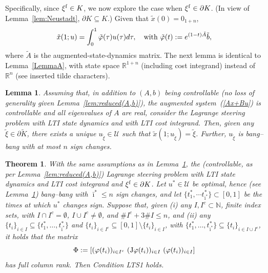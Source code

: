 \documentclass[letterpaper,10pt,conference]{ieeeconf}
\def\R{{\mathbb{R}}}
\def\N{{\mathbb{N}}}
\newtheorem{theorem}{Theorem} %
\newtheorem{lemma}{Lemma} %
\begin{document}
Specifically, since $\xi^{\rm f}\in K$, we now 
explore the case when $\xi^{\rm f}\in\partial K$.
(In view of Lemma~\ref{lem:Neustadt}, $\partial K\subseteq K$.)
Given that $\tilde x(0)=0_{1+n}$,
\[
\tilde x(1;u) =\int_0^1 \tilde\varphi(\tau)u(\tau)d\tau,
\quad {\rm with~} \tilde\varphi(t):=e^{(1-t)\tilde A}\tilde b,
\]
where $\tilde A$ is the augmented-state-dynamics matrix.
The next lemma is identical to Lemma~\ref{LemmaA}, with state space
$\R^{1+n}$ 
(including cost integrand) instead of $\R^n$ (see inserted 
tilde characters).
\begin{lemma}
\label{LemmaB}
Assuming that, in addition to $(A,b)$ being controllable
(no loss of generality given Lemma~\ref{lem:reduced(A,b)}),
the augmented system~(\ref{Ax+Bu}) is controllable and all
eigenvalues of $A$ are real, consider the Lagrange steering 
problem with LTI state dynamics %
and with LTI cost integrand.  
Then, given any $\tilde\xi\in\partial\tilde K$, there exists a unique
$u_{\tilde\xi}\in\mathcal U$ such that $\tilde x(1;u_{\tilde\xi})=\tilde\xi$.
Further, $u_{\tilde\xi}$ is bang--bang with at most $n$ sign changes.
\end{lemma}

\begin{theorem}
\label{prop:vertical tangent}
With the same assumptions as in Lemma~\ref{LemmaB},
the (controllable, as per Lemma~\ref{lem:reduced(A,b)}) 
Lagrange steering problem with LTI state
dynamics and LTI cost integrand and $\xi^{\rm f}\in\partial K$. 
Let $u^*\in\mathcal U$ be optimal, hence (see Lemma~\ref{LemmaB})
bang--bang with $\bar\imath^*\leq n$ sign changes, and let 
$\{t^*_1,\cdots t^*_{\bar\imath^*}\}\subset[0,1]$
be the times at which $u^*$ changes sign.
Suppose that, given (i) any
$I, I^c\subset\N$, finite index sets, with $I\cap I^c=\emptyset$,
$I\cup I^c\not=\emptyset$, and $\#I^c + 3 \#I \leq n$, and (ii) any
$\{t_i\}_{i\in I}\subseteq\{t_1^*,\ldots,t^*_{\bar\imath^*}\}$ 
and
$\{t_i\}_{i\in I^c}\subseteq[0,1]\setminus\{t_i\}_{i\in I}$, with
$\{t_1^*,\ldots,t^*_{\bar\imath^*}\}\subseteq\{t_i\}_{i\in I\cup I^c}$,
it holds that the matrix
\[
\Phi:= \left[
(\varphi(t_i))_{i\in I^c} ~ ({\rm J}\varphi(t_i))_{i\in I}  
~ (\varphi(t_i))_{i\in I}
\right]
\]
has full column rank.  Then Condition LTS1 holds.
\end{theorem}
\end{document}
